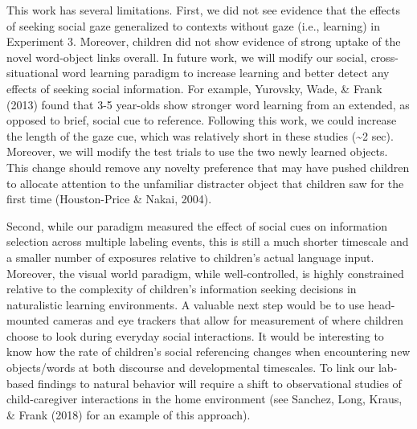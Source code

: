 \documentclass[oneside]{report}
\begin{document}
This work has several limitations. First, we did not see evidence that
the effects of seeking social gaze generalized to contexts without gaze
(i.e., learning) in Experiment 3. Moreover, children did not show
evidence of strong uptake of the novel word-object links overall. In
future work, we will modify our social, cross-situational word learning
paradigm to increase learning and better detect any effects of seeking
social information. For example, Yurovsky, Wade, \& Frank (2013) found
that 3-5 year-olds show stronger word learning from an extended, as
opposed to brief, social cue to reference. Following this work, we could
increase the length of the gaze cue, which was relatively short in these
studies (\textasciitilde{}2 sec). Moreover, we will modify the test
trials to use the two newly learned objects. This change should remove
any novelty preference that may have pushed children to allocate
attention to the unfamiliar distracter object that children saw for the
first time (Houston-Price \& Nakai, 2004).

Second, while our paradigm measured the effect of social cues on
information selection across multiple labeling events, this is still a
much shorter timescale and a smaller number of exposures relative to
children's actual language input. Moreover, the visual world paradigm,
while well-controlled, is highly constrained relative to the complexity
of children's information seeking decisions in naturalistic learning
environments. A valuable next step would be to use head-mounted cameras
and eye trackers that allow for measurement of where children choose to
look during everyday social interactions. It would be interesting to
know how the rate of children's social referencing changes when
encountering new objects/words at both discourse and developmental
timescales. To link our lab-based findings to natural behavior will
require a shift to observational studies of child-caregiver interactions
in the home environment (see Sanchez, Long, Kraus, \& Frank (2018) for
an example of this approach).
\end{document}
